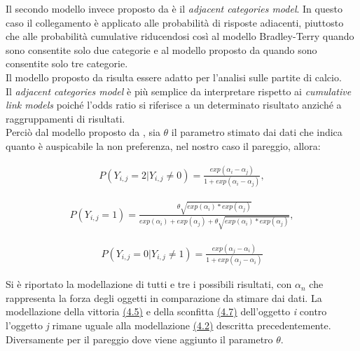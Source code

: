Il secondo modello invece proposto da \autocite{agresti1992analysis} è il \emph{adjacent categories model}. In questo caso il collegamento è applicato alle probabilità di risposte adiacenti, piuttosto che alle probabilità cumulative riducendosi così al modello Bradley-Terry quando sono consentite solo due categorie e al modello proposto da \autocite{davidson1970extending} quando sono consentite solo tre categorie.\\
Il modello proposto da \autocite{davidson1970extending} risulta essere adatto per l'analisi sulle partite di calcio.\\
Il \emph{adjacent categories model} è più semplice da interpretare rispetto ai \emph{cumulative link models} poiché l'odds ratio si riferisce a un determinato risultato anziché a raggruppamenti di risultati. \\
Perciò dal modello proposto da \autocite{davidson1970extending}, sia $\theta$ il parametro stimato dai dati che indica quanto è auspicabile la non preferenza, nel nostro caso il pareggio, allora:

\begin{align}
	P(Y_{i,j} = 2 | Y_{i,j} \not = 0) =  \frac{exp(\alpha_{i} - \alpha_{j})}{1 + exp(\alpha_{i} - \alpha_{j})}, \label{for:4.5}
\end{align}
	
\begin{align}
	P(Y_{i,j} = 1) =  \frac{\theta \sqrt{exp(\alpha_{i}) * exp(\alpha_{j})}}{exp(\alpha_{i}) + exp(\alpha_{j}) + \theta\sqrt{exp(\alpha_{i}) * exp(\alpha_{j})}}, 
\end{align}

\begin{align}	
	P(Y_{i,j} = 0 | Y_{i,j} \not = 1) =  \frac{exp(\alpha_{j} - \alpha_{i})}{1 + exp(\alpha_{j} - \alpha_{i})}\label{for:4.7}
\end{align}

Si è riportato la modellazione di tutti e tre i possibili risultati, con $\alpha_{n}$ che rappresenta la forza degli oggetti in comparazione da stimare dai dati. La modellazione della vittoria \hyperref[for:4.5]{(4.5)} e della sconfitta \hyperref[for:4.7]{(4.7)} dell'oggetto \textit{i} contro l'oggetto \textit{j} rimane uguale alla modellazione \hyperref[for:3.1]{(4.2)} descritta precedentemente. Diversamente per il pareggio dove viene aggiunto il parametro $\theta$. \\


